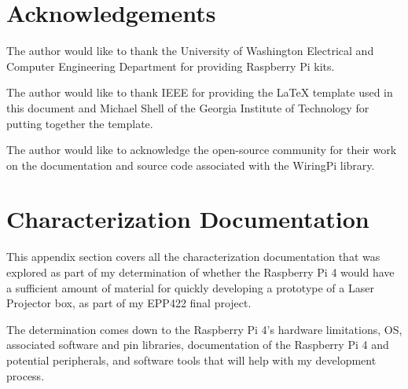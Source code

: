 \documentclass[journal]{IEEEtran}
\begin{document}
    \nocite{*}
    \newpage

    
    

    \newpage
    \section{Acknowledgements}
    The author would like to thank the University of Washington Electrical and Computer Engineering Department for providing Raspberry Pi kits.

    The author would like to thank IEEE for providing the LaTeX template used in this document and Michael Shell of the Georgia Institute of Technology for putting together the template.

    The author would like to acknowledge the open-source community for their work on the documentation and source code associated with the WiringPi library. 

    \appendices
    \section{Characterization Documentation}
    This appendix section covers all the characterization documentation that was explored as part of my determination of whether the Raspberry Pi 4 would have a sufficient amount of material for quickly developing a prototype of a
    Laser Projector box, as part of my EPP422 final project.
    
    The determination comes down to the Raspberry Pi 4's hardware limitations, OS, associated software and pin libraries, documentation of the Raspberry Pi 4 and potential peripherals, and software tools that 
    will help with my development process.
\end{document}
